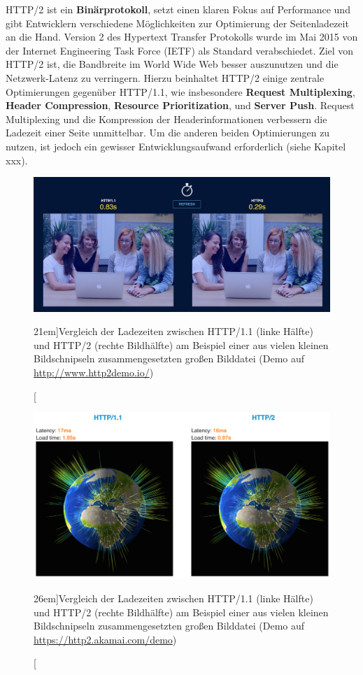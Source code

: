 \documentclass[a4paper, justified, notoc]{tufte-handout} %
\begin{document}
HTTP/2 ist ein \textbf{Binärprotokoll}, setzt einen klaren Fokus auf Performance und gibt Entwicklern verschiedene Möglichkeiten zur Optimierung der Seitenladezeit an die Hand. 
Version 2 des Hypertext Transfer Protokolls wurde im Mai 2015 von der Internet Engineering Task Force (IETF) als Standard verabschiedet. 
Ziel von HTTP/2 ist, die Bandbreite im World Wide Web besser auszunutzen und die Netzwerk-Latenz zu verringern. Hierzu beinhaltet HTTP/2 einige zentrale Optimierungen gegenüber HTTP/1.1, wie insbesondere \textbf{Request Multiplexing}, \textbf{Header Compression}, \textbf{Resource Prioritization}, und \textbf{Server Push}.
Request Multiplexing und die Kompression der Headerinformationen verbessern die Ladezeit einer Seite unmittelbar. Um die anderen beiden Optimierungen zu nutzen, ist jedoch ein gewisser Entwicklungsaufwand erforderlich (siehe Kapitel xxx).

\begin{figure}%
	\centering
  \includegraphics[width=1.5\textwidth]{./figures/http2_demo_people.png}
  \caption[][21em]{Vergleich der Ladezeiten zwischen HTTP/1.1 (linke Hälfte) und HTTP/2 (rechte Bildhälfte) am Beispiel einer aus vielen kleinen Bildschnipseln zusammengesetzten großen Bilddatei (Demo auf \url{http://www.http2demo.io/})}
  \label{fig:http2_demo_1}
\end{figure}

\begin{figure}%
	\centering
  \includegraphics[width=1.5\textwidth]{./figures/http2_demo_globe.png}
  \caption[][26em]{Vergleich der Ladezeiten zwischen HTTP/1.1 (linke Hälfte) und HTTP/2 (rechte Bildhälfte) am Beispiel einer aus vielen kleinen Bildschnipseln zusammengesetzten großen Bilddatei (Demo auf \url{https://http2.akamai.com/demo})}
  \label{fig:http2_demo_2}
\end{figure}
\end{document}
